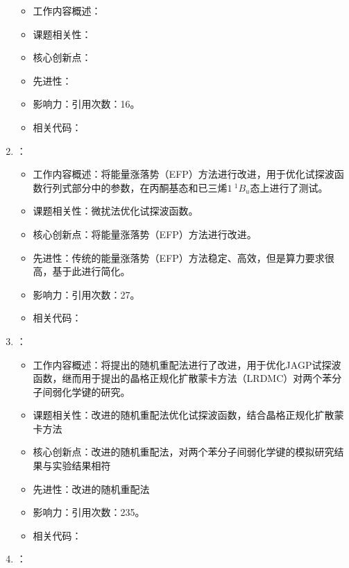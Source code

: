 \begin{enumerate}
            \begin{itemize}
                \item 工作内容概述：
                \item 课题相关性：
                \item 核心创新点：
                \item 先进性：
                \item 影响力：引用次数：16。
                \item 相关代码：
            \end{itemize}
        \item \citet{scemama2006simple}：
            \begin{itemize}
                \item 工作内容概述：将能量涨落势（EFP）方法进行改进，用于优化试探波函数行列式部分中的参数，在丙酮基态和已三烯$1~^{1}B_u$态上进行了测试。
                \item 课题相关性：微扰法优化试探波函数。
                \item 核心创新点：将能量涨落势（EFP）方法进行改进。
                \item 先进性：传统的能量涨落势（EFP）方法稳定、高效，但是算力要求很高，基于此进行简化。
                \item 影响力：引用次数：27。
                \item 相关代码：
            \end{itemize}
        \item \citet{sorella2007weak}：
            \begin{itemize}
                \item 工作内容概述：将\citet{sorella2001generalized}提出的随机重配法进行了改进，用于优化JAGP试探波函数，继而用于\citet{casula2005diffusion}提出的晶格正规化扩散蒙卡方法（LRDMC）对两个苯分子间弱化学键的研究。
                \item 课题相关性：改进的随机重配法优化试探波函数，结合晶格正规化扩散蒙卡方法
                \item 核心创新点：改进的随机重配法，对两个苯分子间弱化学键的模拟研究结果与实验结果相符
                \item 先进性：改进的随机重配法
                \item 影响力：引用次数：235。
                \item 相关代码：
            \end{itemize}
        \item \citet{umrigar2007alleviation}：
            \begin{itemize}

\end{itemize}
\end{enumerate}
